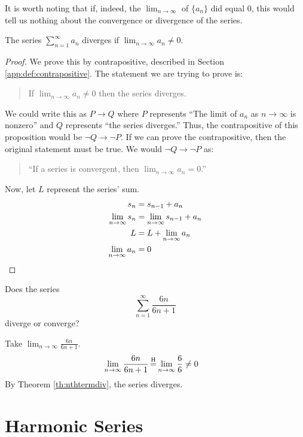 It is worth noting that if, indeed, the \(\lim_{n\to \infty}\) of \( \{a_n\} \) did equal $0$, this would
tell us nothing about the convergence or divergence of the series.

\begin{theorem}\label{th:nthtermdiv}
  The series $\sum^\infty_{n=1} a_n$ diverges if \(\lim_{n\to \infty} a_n \neq 0
  \).
  \begin{proof}
    We prove this by contrapositive, described in Section
    \ref{app:def:contrapositive}. The statement we are trying to prove is:
    \begin{quote}
      If \(\lim_{n\to \infty} a_n \neq 0 \) then the series diverges.
    \end{quote}
    We could write this as $P \to Q$ where $P$ represents ``The limit of $a_n$
    as $n \to \infty$ is nonzero'' and $Q$ represents ``the series diverges.''
    Thus, the contrapositive of this proposition would be $\neg Q \to \neg P$.
    If we can prove the contrapositive, then the original statement must be
    true.
    We would $\neg Q \to \neg P$ as:
    \begin{quote}
      ``If a series is convergent, then \( \lim_{n \to \infty} a_n = 0\).''
    \end{quote}
    Now, let $L$ represent the series' sum.
    \begin{align*}
      s_n &= s_{n-1} + a_n \\
      \lim_{n \to \infty} s_n &= \lim_{n \to \infty} s_{n-1} + a_n \\
      L&=L + \lim_{n\to \infty} a_n \\
      \lim_{n\to \infty} a_n &= 0\qedhere
    \end{align*}
  \end{proof}
\end{theorem}

\begin{ex}
  Does the series
  \[ \sum^\infty_{n=1} \frac{6n}{6n+1} \]
  diverge or converge?
  \begin{sol}
    Take \( \lim_{n\to\infty} \frac{6n}{6n+1} \).
    \begin{align*}
      \lim_{n\to\infty} \frac{6n}{6n+1}
      &\=H \lim_{n\to\infty} \frac{6}{6} \neq 0
    \end{align*}
    By Theorem \ref{th:nthtermdiv}, the series diverges.
  \end{sol}
\end{ex}

\section{Harmonic Series}


